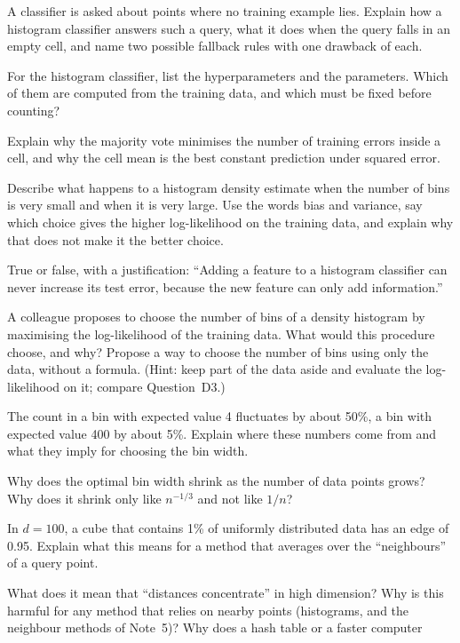 \documentclass[11pt]{article}
\begin{document}
\begin{questions}
\begin{conceptual}
\item A classifier is asked about points where no training example lies. Explain how a histogram
classifier answers such a query, what it does when the query falls in an empty cell, and name two possible fallback rules with
one drawback of each.
\item For the histogram classifier, list the hyperparameters and the parameters. Which of them are computed from the
training data, and which must be fixed before counting?
\item Explain why the majority vote minimises the number of training errors inside a cell, and why the cell mean is
the best constant prediction under squared error.
\item Describe what happens to a histogram density estimate when the number of bins is very small and when it is very
large. Use the words bias and variance, say which choice gives the higher log-likelihood on the training data, and
explain why that does not make it the better choice.
\item True or false, with a justification: ``Adding a feature to a histogram classifier can never increase its test
error, because the new feature can only add information.''
\item A colleague proposes to choose the number of bins of a density histogram by maximising the log-likelihood of the
training data. What would this procedure choose, and why? Propose a way to choose the number of bins using only the
data, without a formula. (Hint: keep part of the data aside and evaluate the log-likelihood on it; compare
Question~D3.)
\item The count in a bin with expected value 4 fluctuates by about 50\%, a bin with expected value 400 by about 5\%.
Explain where these numbers come from and what they imply for choosing the bin width.
\item Why does the optimal bin width shrink as the number of data points grows? Why does it shrink only like
$n^{-1/3}$ and not like $1/n$?
\item In $d = 100$, a cube that contains 1\% of uniformly distributed data has an edge of 0.95. Explain what this
means for a method that averages over the ``neighbours'' of a query point.
\item What does it mean that ``distances concentrate'' in high dimension? Why is this harmful for any method that
relies on nearby points (histograms, and the neighbour methods of Note~5)? Why does a hash table or a faster computer

\end{conceptual}
\end{questions}
\end{document}
